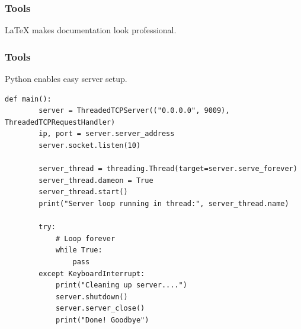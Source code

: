 \documentclass{beamer}
\newcounter{tools}
\begin{document}
\begin{frame}
    \frametitle{Tools }

    \LaTeX{} makes documentation look professional.

    \centering
\end{frame}


\begin{frame}[fragile,c]
    \frametitle{Tools }

    Python enables easy server setup.

    \begin{lstlisting}[style=cpython]
    def main():
        server = ThreadedTCPServer(("0.0.0.0", 9009), ThreadedTCPRequestHandler)
        ip, port = server.server_address
        server.socket.listen(10)

        server_thread = threading.Thread(target=server.serve_forever)
        server_thread.dameon = True
        server_thread.start()
        print("Server loop running in thread:", server_thread.name)

        try:
            # Loop forever
            while True:
                pass
        except KeyboardInterrupt:
            print("Cleaning up server....")
            server.shutdown()
            server.server_close()
            print("Done! Goodbye")

    \end{lstlisting}
\end{frame}
\end{document}
